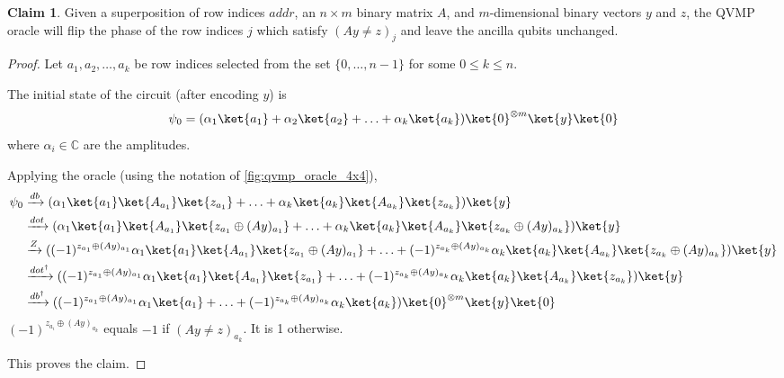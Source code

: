 \documentclass[11pt]{article}
\theoremstyle{definition}
\newtheorem*{claim*}{Claim}
\theoremstyle{remark}
\begin{document}
\begin{claim*}
  Given a superposition of row indices $addr$, an $n \times m$ binary matrix $A$,
  and $m$-dimensional binary vectors $y$ and $z$, the QVMP oracle will flip the
  phase of the row indices $j$ which satisfy $(Ay \neq z)_j$ and leave the ancilla
  qubits unchanged.
\end{claim*}
\begin{proof}
  Let $a_1, a_2, \ldots, a_k$ be row indices selected from the set $\{0, \ldots,
  n-1\}$ for some $0 \leq k \leq n$.

  The initial state of the circuit (after encoding $y$) is
  \begin{equation*}
    \psi_0 = (\alpha_1\ket{a_1} + \alpha_2\ket{a_2} + \ldots +
    \alpha_k\ket{a_k})\ket{0}^{\otimes m}\ket{y}\ket{0}
  \end{equation*}
  where $\alpha_i \in \mathbb{C}$ are the amplitudes.

  Applying the oracle (using the notation of \cref{fig:qvmp_oracle_4x4}),
  \begin{align*}
    \psi_0 & \xrightarrow{db}
      (\alpha_1\ket{a_1}\ket{A_{a_1}}\ket{z_{a_1}} + \ldots +
       \alpha_k\ket{a_k}\ket{A_{a_k}}\ket{z_{a_k}})\ket{y} \\
    & \xrightarrow{dot}
      (\alpha_1\ket{a_1}\ket{A_{a_1}}\ket{z_{a_1} \oplus (Ay)_{a_1}} + \ldots +
       \alpha_k\ket{a_k}\ket{A_{a_k}}\ket{z_{a_k} \oplus (Ay)_{a_k}})\ket{y} \\
    & \xrightarrow{Z}
      ((-1)^{z_{a_1} \oplus
       (Ay)_{a_1}}\alpha_1\ket{a_1}\ket{A_{a_1}}\ket{z_{a_1} \oplus (Ay)_{a_1}} + \ldots +
       (-1)^{z_{a_k} \oplus
       (Ay)_{a_k}}\alpha_k\ket{a_k}\ket{A_{a_k}}\ket{z_{a_k} \oplus (Ay)_{a_k}})\ket{y} \\
    & \xrightarrow{dot^\dagger}
      ((-1)^{z_{a_1} \oplus
       (Ay)_{a_1}}\alpha_1\ket{a_1}\ket{A_{a_1}}\ket{z_{a_1}} + \ldots +
       (-1)^{z_{a_k} \oplus
       (Ay)_{a_k}}\alpha_k\ket{a_k}\ket{A_{a_k}}\ket{z_{a_k}})\ket{y} \\
    & \xrightarrow{db^\dagger}
      ((-1)^{z_{a_1} \oplus
       (Ay)_{a_1}}\alpha_1\ket{a_1} + \ldots +
       (-1)^{z_{a_k} \oplus
       (Ay)_{a_k}}\alpha_k\ket{a_k})\ket{0}^{\otimes m}\ket{y}\ket{0}
  \end{align*}
  $(-1)^{z_{a_i} \oplus (Ay)_{a_k}}$ equals $-1$ if $(Ay \neq z)_{a_k}$. It is 1
  otherwise.

  This proves the claim.
\end{proof}
\end{document}
